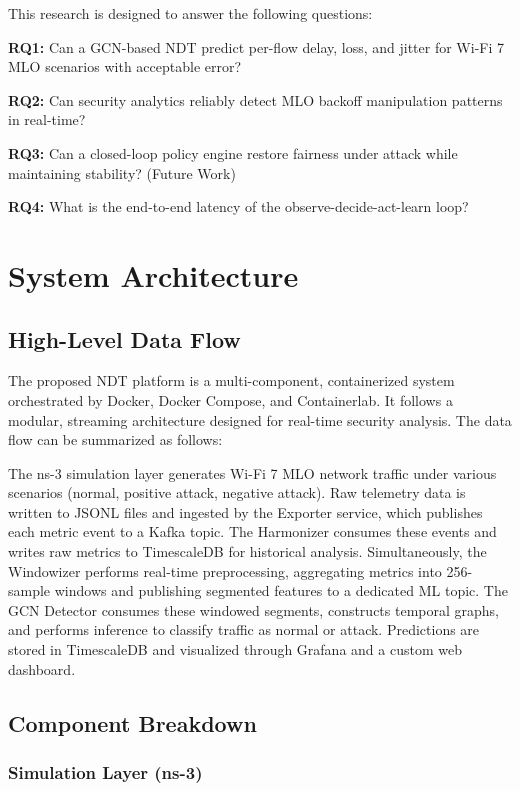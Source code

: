 \documentclass[conference]{IEEEtran}
\begin{document}
This research is designed to answer the following questions:

\textbf{RQ1:} Can a GCN-based NDT predict per-flow delay, loss, and jitter for Wi-Fi 7 MLO scenarios with acceptable error?

\textbf{RQ2:} Can security analytics reliably detect MLO backoff manipulation patterns in real-time?

\textbf{RQ3:} Can a closed-loop policy engine restore fairness under attack while maintaining stability? (Future Work)

\textbf{RQ4:} What is the end-to-end latency of the observe-decide-act-learn loop?

\section{System Architecture}
\label{sec:architecture}

\subsection{High-Level Data Flow}

The proposed NDT platform is a multi-component, containerized system orchestrated by Docker, Docker Compose, and Containerlab. It follows a modular, streaming architecture designed for real-time security analysis. The data flow can be summarized as follows:

The ns-3 simulation layer generates Wi-Fi 7 MLO network traffic under various scenarios (normal, positive attack, negative attack). Raw telemetry data is written to JSONL files and ingested by the Exporter service, which publishes each metric event to a Kafka topic. The Harmonizer consumes these events and writes raw metrics to TimescaleDB for historical analysis. Simultaneously, the Windowizer performs real-time preprocessing, aggregating metrics into 256-sample windows and publishing segmented features to a dedicated ML topic. The GCN Detector consumes these windowed segments, constructs temporal graphs, and performs inference to classify traffic as normal or attack. Predictions are stored in TimescaleDB and visualized through Grafana and a custom web dashboard.

\subsection{Component Breakdown}

\subsubsection{Simulation Layer (ns-3)}
\end{document}
